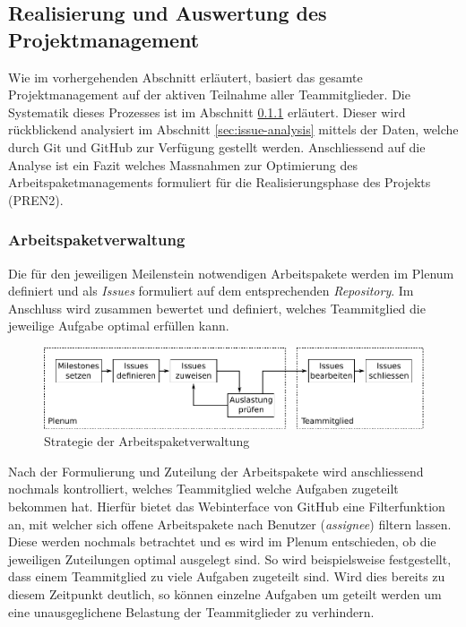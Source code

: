 \subsection{Realisierung und Auswertung des Projektmanagement}
Wie im vorhergehenden Abschnitt erläutert, basiert das gesamte
Projektmanagement auf der aktiven Teilnahme aller Teammitglieder.
Die Systematik dieses Prozesses ist im Abschnitt 
\ref{sec:issue-management} erläutert. Dieser wird rückblickend
analysiert im Abschnitt \ref{sec:issue-analysis} mittels der Daten,
welche durch Git und GitHub zur Verfügung gestellt werden.
Anschliessend auf die Analyse ist ein Fazit welches Massnahmen zur
Optimierung des Arbeitspaketmanagements formuliert für die
Realisierungsphase des Projekts (PREN2).

\subsubsection{Arbeitspaketverwaltung}\label{sec:issue-management}
Die für den jeweiligen Meilenstein notwendigen Arbeitspakete werden im
Plenum definiert und als \emph{Issues} formuliert auf dem entsprechenden
\emph{Repository}. Im Anschluss wird zusammen bewertet und definiert,
welches Teammitglied die jeweilige Aufgabe optimal erfüllen kann.

\begin{figure}[h!]
	\centering
	\includegraphics[scale=1]{../../fig/pm/issue_01.pdf}
	\caption{Strategie der Arbeitspaketverwaltung}
	\label{fig:pm-issue-01}
\end{figure}

Nach der Formulierung und Zuteilung der Arbeitspakete wird anschliessend
nochmals kontrolliert, welches Teammitglied welche Aufgaben zugeteilt
bekommen hat. Hierfür bietet das Webinterface von GitHub eine
Filterfunktion an, mit welcher sich offene Arbeitspakete nach Benutzer
(\emph{assignee}) filtern lassen. Diese werden nochmals betrachtet und
es wird im Plenum entschieden, ob die jeweiligen Zuteilungen optimal
ausgelegt sind. So wird beispielsweise festgestellt, dass einem
Teammitglied zu viele Aufgaben zugeteilt sind. Wird dies bereits zu
diesem Zeitpunkt deutlich, so können einzelne Aufgaben um geteilt werden
um eine unausgeglichene Belastung der Teammitglieder zu verhindern.

